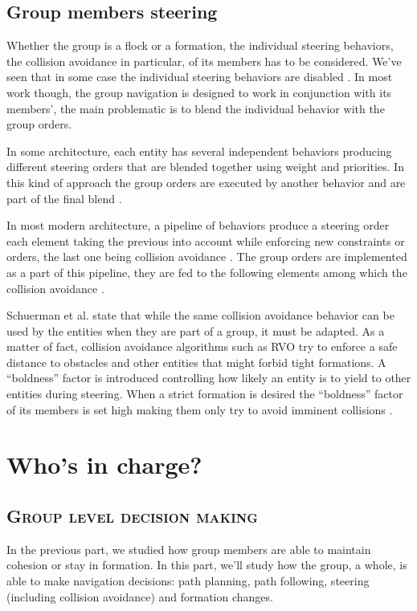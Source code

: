 \documentclass[a4paper,titlepage]{article}
\newcommand{\sectionsubtitle}[1]{{\subsection*{\scshape #1}}}
\begin{document}
\subsection{Group members steering}
\label{sec:stay_grouped:group_members_steering}

Whether the group is a flock or a formation, the individual steering behaviors, the collision avoidance in particular, of its members has to be considered. We’ve seen that in some case the individual steering behaviors are disabled \cite{Pottinger:1999vk}. In most work though, the group navigation is designed to work in conjunction with its members’, the main problematic is to blend the individual behavior with the group orders.

In some architecture, each entity has several independent behaviors producing different steering orders that are blended together using weight and priorities. In this kind of approach the group orders are executed by another behavior and are part of the final blend \cite{Moussaid:2010ib,Qiu:2010ww,Hostetler:2002wg}. 

In most modern architecture, a pipeline of behaviors produce a steering order each element taking the previous into account while enforcing new constraints or orders, the last one being collision avoidance \cite{GolaemPath:tw,Mononen:2010wp}. The group orders are implemented as a part of this pipeline, they are fed to the following elements among which the collision avoidance \cite{Karamouzas:2010fi,Silveira:2008bc}. 

Schuerman et al. state that while the same collision avoidance behavior can be used by the entities when they are part of a group, it must be adapted. As a matter of fact, collision avoidance algorithms such as RVO \cite{vandenBerg:2008tu} try to enforce a safe distance to obstacles and other entities that might forbid tight formations. A “boldness” factor is introduced controlling how likely an entity is to yield to other entities during steering. When a strict formation is desired the “boldness” factor of its members is set high making them only try to avoid imminent collisions \cite{Schuerman:2010um}.

\section{Who's in charge?}
\label{sec:who_s_in_charge}
\sectionsubtitle{Group level decision making}

In the previous part, we studied how group members are able to maintain cohesion or stay in formation. In this part, we’ll study how the group, a whole, is able to make navigation decisions: path planning, path following, steering (including collision avoidance) and formation changes. 
\end{document}
